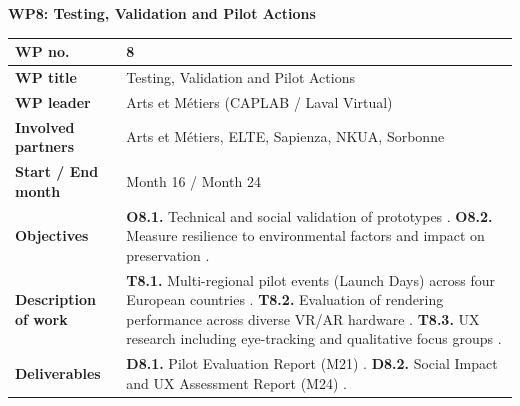 \textbf{WP8: Testing, Validation and Pilot Actions}
\begin{table}[H]
\centering
\small
\renewcommand{\arraystretch}{1.2}
\begin{tabularx}{\textwidth}{|l|X|}
\hline
\rowcolor{gray!10} \textbf{WP no.} & 8 \\ \hline
\textbf{WP title} & Testing, Validation and Pilot Actions  \\ \hline
\textbf{WP leader} & Arts et Métiers (CAPLAB / Laval Virtual)  \\ \hline
\textbf{Involved partners} & Arts et Métiers, ELTE, Sapienza, NKUA, Sorbonne  \\ \hline
\textbf{Start / End month} & Month 16 / Month 24  \\ \hline
\textbf{Objectives} & \textbf{O8.1.} Technical and social validation of prototypes . \newline \textbf{O8.2.} Measure resilience to environmental factors and impact on preservation . \\ \hline
\textbf{Description of work} & \textbf{T8.1.} Multi-regional pilot events (Launch Days) across four European countries . \newline \textbf{T8.2.} Evaluation of rendering performance across diverse VR/AR hardware . \newline \textbf{T8.3.} UX research including eye-tracking and qualitative focus groups . \\ \hline
\textbf{Deliverables} & \textbf{D8.1.} Pilot Evaluation Report (M21) . \newline \textbf{D8.2.} Social Impact and UX Assessment Report (M24) . \\ \hline
\end{tabularx}
\end{table}